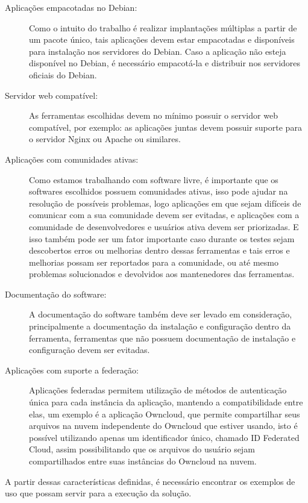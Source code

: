 \begin{description}
  \item  [Aplicações empacotadas no Debian:] Como o intuito do trabalho
  é realizar implantações múltiplas a partir de um pacote único, tais aplicações
  devem estar empacotadas e disponíveis para instalação nos servidores do Debian. Caso
a aplicação não esteja disponível no Debian, é necessário empacotá-la e distribuir
nos servidores oficiais do Debian.
 \item  [Servidor web compatível:] As ferramentas escolhidas devem no
  mínimo possuir o servidor web compatível, por exemplo: as aplicações juntas
  devem possuir suporte para o servidor Nginx ou Apache ou similares.
  \item  [Aplicações com comunidades ativas:] Como estamos trabalhando
  com software livre, é importante que os softwares escolhidos possuem comunidades
  ativas, isso pode ajudar na resolução de possíveis problemas, logo aplicações
  em que sejam difíceis de comunicar com a sua comunidade devem ser evitadas, e
  aplicações com a comunidade de desenvolvedores e usuários ativa devem ser priorizadas.
  E isso também pode ser um fator importante caso durante os testes sejam descobertos
  erros ou melhorias dentro dessas ferramentas e tais erros e melhorias possam ser
  reportados para a comunidade, ou até mesmo problemas solucionados e devolvidos aos mantenedores
  das ferramentas.
  \item  [Documentação do software:] A documentação do software também deve
  ser levado em consideração, principalmente a documentação da instalação e configuração
  dentro da ferramenta, ferramentas que não possuem documentação de instalação e
  configuração devem ser evitadas.
  \item  [Aplicações com suporte a federação:] Aplicações federadas permitem
 utilização de métodos de autenticação única para cada instância da aplicação,
mantendo a compatibilidade entre elas, um exemplo é a aplicação Owncloud,
que permite compartilhar seus arquivos na nuvem independente do Owncloud que estiver usando,
isto é possível utilizando apenas um identificador único, chamado ID Federated Cloud, assim
possibilitando que os arquivos do usuário sejam compartilhados entre suas instâncias do
Owncloud na nuvem.
\end{description}

A partir dessas características definidas, é necessário encontrar os exemplos de uso
que possam servir para a execução da solução.

